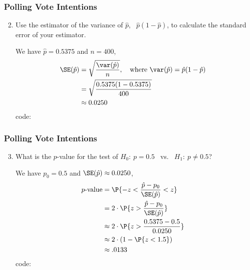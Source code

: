 \begin{frame}
\frametitle{Polling Vote Intentions}
\ask
\begin{enumerate}\setcounter{enumi}{1}

\item Use the estimator of the variance of $\hat{p}$,~  $\hat{p}(1-\hat{p})$, to calculate the standard error of your estimator. 

\begin{answer}
We have $\hat{p}=0.5375$ and $n=400$,
\begin{align*}
\SE(\hat{p})
  & = \sqrt{\frac{\var(\hat{p})}{n}}, 
  \quad\text{where}~
  \var(\hat{p})
    = \hat{p}(1-\hat{p})\\
  & = \sqrt{\frac{0.5375(1-0.5375)}{400}}\\
  & \approx 0.0250
\end{align*}
\Rlang code:\ 
\end{answer}

\end{enumerate}
\end{frame}


\begin{frame}
\frametitle{Polling Vote Intentions}
\ask
\begin{enumerate}\setcounter{enumi}{2}

\item What is the $p$-value for the test of $H_{0}{:}~ p=0.5$ ~vs.~ $H_{1}{:}~ p\neq 0.5$?

\begin{answer}
We have $p_0=0.5$ and $\SE(\hat{p})\approx0.0250$, 
\begin{align*}
p\text{-value} 
  & = \P{-z
    < \frac{\hat{p}-p_0}{\SE(\hat{p})} 
    < z }\\
  & = 2\cdot \P{ z > \frac{\hat{p}-p_0}{\SE(\hat{p})} }\\
  & \approx 2\cdot \P{ z > \frac{0.5375-0.5}{0.0250} }\\
  & \approx 2\cdot \left(1-\P{z < 1.5}\right)\\
  & \approx .0133
\end{align*}
\Rlang code:\ 
\newline
  \hspace*{30pt} 
\end{answer}

\end{enumerate}
\end{frame}


